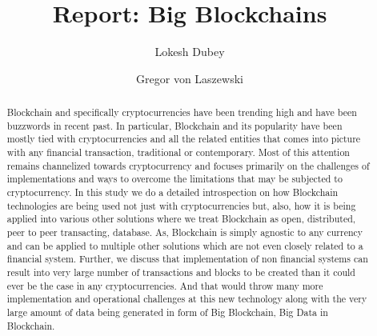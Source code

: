 
\title{Report: Big Blockchains}


\author{Lokesh Dubey}

\renewcommand{\shortauthors}{L. Dubey}

\author{Gregor von Laszewski}


\renewcommand{\shortauthors}{G. v. Laszewski}


\begin{abstract}

  Blockchain and specifically cryptocurrencies have been trending high
  and have been buzzwords in recent past. In particular, Blockchain
  and its popularity have been mostly tied with cryptocurrencies and
  all the related entities that comes into picture with any financial
  transaction, traditional or contemporary. Most of this attention
  remains channelized towards cryptocurrency and focuses primarily on
  the challenges of implementations and ways to overcome the
  limitations that may be subjected to cryptocurrency. In this study
  we do a detailed introspection on how Blockchain technologies are
  being used not just with cryptocurrencies but, also, how it is being
  applied into various other solutions where we treat Blockchain as
  open, distributed, peer to peer transacting, database. As,
  Blockchain is simply agnostic to any currency and can be applied to
  multiple other solutions which are not even closely related to a
  financial system. Further, we discuss that implementation of non
  financial systems can result into very large number of transactions
  and blocks to be created than it could ever be the case in any
  cryptocurrencies. And that would throw many more implementation and
  operational challenges at this new technology along with the very
  large amount of data being generated in form of Big Blockchain, Big
  Data in Blockchain.

\end{abstract}


